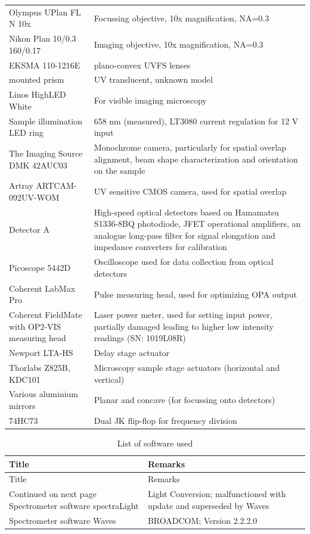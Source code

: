 \documentclass[twoside,openright]{scrreprt}
\begin{document}
\begin{longtable}{p{}p{}}
    Olympus UPlan FL N 10x & Focussing objective, 10x magnification, NA=0.3 \\
    Nikon Plan 10/0.3 160/0.17 & Imaging objective, 10x magnification, NA=0.3 \\
    EKSMA 110-1216E & plano-convex UVFS lenses\\
    mounted prism & UV translucent, unknown model\\
    Linos HighLED White & For visible imaging microscopy \\
    Sample illumination LED ring & 658 nm (measured), LT3080 current regulation for 12 V input \\
    The Imaging Source DMK 42AUC03 & Monochrome camera, particularly for spatial overlap alignment, beam shape characterization and orientation on the sample \\
    Artray ARTCAM-092UV-WOM & UV sensitive CMOS camera, used for spatial overlap\\
    Detector A & High-speed optical detectors based on Hamamatsu S1336-8BQ photodiode, JFET operational amplifiers, an analogue  long-pass filter for signal elongation and impedance converters for calibration \\
    Picoscope 5442D & Oscilloscope used for data collection from optical detectors \\
    Coherent LabMax Pro & Pulse measuring head, used for optimizing OPA output \\
    Coherent FieldMate with OP2-VIS measuring head & Laser power meter, used for setting input power, partially damaged leading to higher low intensity readings (SN: 1019L08R) \\
    Newport LTA-HS & Delay stage actuator \\
    Thorlabs Z825B, KDC101 & Microscopy sample stage actuators (horizontal and vertical) \\
    Various aluminium mirrors & Planar and concave (for focussing onto detectors) \\
    74HC73 & Dual JK flip-flop for frequency division
\end{longtable}
\begin{longtable}{p{}p{}}
    \caption{List of software used}
    \label{tab:devices} \\
    \toprule 
    Title & Remarks \\
    \midrule
    \endfirsthead
    \toprule 
    Title & Remarks \\
    \midrule
    \endhead
    \midrule
    Continued on next page
    \endfoot
    \bottomrule
    \endlastfoot
    Spectrometer software spectraLight & Light Conversion; malfunctioned with update and superseded by Waves \\
    Spectrometer software Waves & BROADCOM; Version 2.2.2.0\\
\end{longtable}
\end{document}

